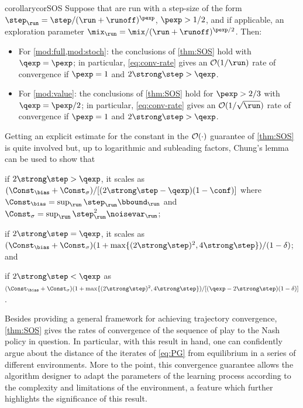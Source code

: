 \begin{restatable}{corollary}{corSOS}
\label{cor:SOS}
Suppose that  are run with a step-size of the form $\curr[\step] = \step/(\run+\runoff)^{\pexp}$, $\pexp>1/2$, and if applicable, an exploration parameter $\curr[\mix] = \mix/(\run+\runoff)^{\pexp/2}$.
Then:
\begin{itemize}
\item
For \cref{mod:full,mod:stoch}:
the conclusions of \cref{thm:SOS} hold with $\qexp=\pexp$;
in particular, \eqref{eq:conv-rate} gives an $\bigoh(1/\run)$ rate of convergence if $\pexp=1$ and $2\strong\step > \qexp$.
\item
For \cref{mod:value}:
the conclusions of \cref{thm:SOS} hold for $\pexp>2/3$ with $\qexp = \pexp/2$;
in particular, \eqref{eq:conv-rate} gives an $\bigoh(1/\sqrt{\run})$ rate of convergence if $\pexp=1$ and $2\strong\step > \qexp$.
\end{itemize}
\end{restatable}

\beginrev
\begin{remark}
Getting an explicit estimate for the constant in the $\operatorname{\mathcal{O}}(\cdot)$ guarantee of \cref{thm:SOS} is quite involved but, up to logarithmic and subleading factors, Chung's lemma \cite{Chu54,Pol87} can be used to show that
\begin{enumerate*}
\item
if $2\strong\step > \qexp$, it scales as $(\Const_{\bias}+\Const_{\sigma})/[(2\strong\step - \qexp)(1-\conf)]$ where $\Const_{\bias} = \sup_{\run} \curr[\step]\curr[\bbound]$ and $\Const_{\sigma} = \sup_{\run} \curr[\step]^2\curr[\noisevar]$;
\item
if $2\strong\step = \qexp$, it scales as %
$(\Const_{\bias}+\Const_{\sigma})(1+ \max\{(2\strong\step)^2,4\strong\step\})/(1-\delta)$; 
and  
\item if $2\strong\step < \qexp$ as $(\Const_{\bias}+\Const_{\sigma})(1+ \max\{(2\strong\step)^2,4\strong\step\})/[(\qexp -2\strong\step)(1-\delta)]$.
\end{enumerate*}
\end{remark}
\endedit

Besides providing
a general framework for achieving trajectory convergence, \cref{thm:SOS} gives the rates of convergence of the sequence of play to the Nash policy in question.
In particular, with this result in hand, one can confidently argue about the distance of the iterates of \eqref{eq:PG} from equilibrium in a series of different environments.
More to the point, this convergence guarantee allows the algorithm designer to adapt the parameters of the learning process according to the complexity and limitations of the environment, a feature which further highlights the significance of this result.

